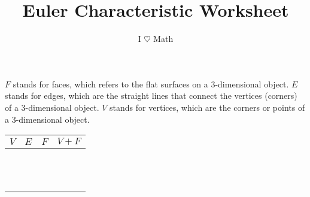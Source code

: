 \documentclass{article}
\title{Euler Characteristic Worksheet}
\author{I $\heartsuit$ Math}
\date{}
\begin{document}
\maketitle

$F$ stands for faces, which refers to the flat surfaces on a 3-dimensional object.
$E$ stands for edges, which are the straight lines that connect the vertices (corners) of a 3-dimensional object.
$V$ stands for vertices, which are the corners or points of a 3-dimensional object.

\Huge
\begin{center}
\begin{tabular}{c|c|c|c}
$V$ & $E$ & $F$ & $V+F$ \\
  \hline
  \hline & & &  \\
  \hline & & &  \\
  \hline & & &  \\
  \hline & & &  \\
  \hline & & &  \\
  \hline & & &  \\
  \hline & & &  \\
  \hline & & &  \\
  \hline & & &  \\
  \hline & & &  \\
  \hline & & &  \\
  \hline & & &  \\
\end{tabular}
\end{center}
\end{document}
